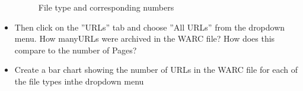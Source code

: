\documentclass[12pt]{article}
\begin{document}
\begin{itemize}
\begin{figure}[H]
                \caption{File type and corresponding numbers}
                \label{fig:Q3Ans}
            \end{figure}
    \item Then  click  on  the  ”URLs”  tab  and  choose  ”All  URLs”  from  the  dropdown  menu.   How  manyURLs were archived in the WARC file? How does this compare to the number of Pages?
    \item Create a bar chart showing the number of URLs in the WARC file for each of the file types inthe dropdown menu
\end{itemize}
\end{document}
